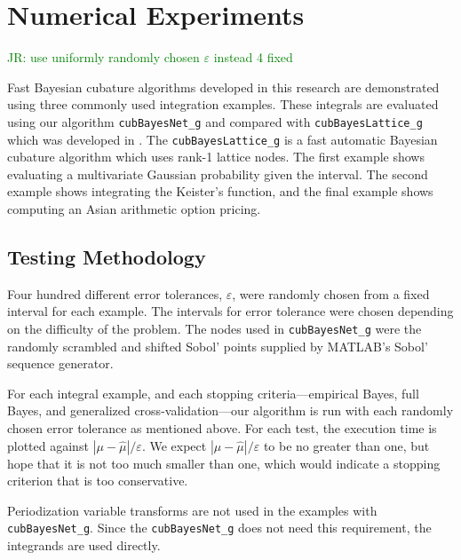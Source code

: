 \documentclass{svjour3}                     %
\newcommand{\hmu}{\widehat{\mu}}
\newcommand{\code}[1]{\texttt{#1}}
\def\abs#1{\ensuremath{\left \lvert #1 \right \rvert}}
\newcommand\secref{Section~\ref}
\newcommand{\JRNote}[1]{{\textcolor{green}{JR: #1}}}
\begin{document}
\section{Numerical Experiments}

\label{sec:NumExp}

\JRNote{use uniformly randomly chosen $\varepsilon$ instead 4 fixed}

Fast Bayesian cubature algorithms developed in this research are demonstrated using three commonly used integration examples.
These integrals are evaluated using our algorithm \code{cubBayesNet\_g} and compared with \code{cubBayesLattice\_g} which was developed in \cite{JagHic19a}. The \code{cubBayesLattice\_g} is a fast automatic Bayesian cubature algorithm which uses rank-1 lattice nodes. The first example shows evaluating a multivariate Gaussian probability given the interval. The second example shows integrating the Keister's function, and the final example shows computing an Asian arithmetic option pricing.  


\subsection{Testing Methodology}
\label{sec:numerical_experiments_cubBayesLattice}

Four hundred different error tolerances, $\varepsilon$, were randomly chosen from a fixed interval  for each example. 
The intervals for error tolerance were chosen depending on the difficulty of the problem.
The nodes used in \code{cubBayesNet\_g} were the randomly scrambled and shifted Sobol' points supplied by MATLAB's Sobol' sequence generator. 

For each integral example, and each stopping criteria---empirical Bayes, full Bayes, and generalized cross-validation---our algorithm is run with each randomly chosen error tolerance as mentioned above.  For each test, the execution time is plotted against $\abs{\mu - \hmu}/\varepsilon$.  We expect $\abs{\mu - \hmu}/\varepsilon$ to be no greater than one, but hope that it is not too much smaller than one, which would indicate a stopping criterion that is too conservative.


Periodization variable transforms are not used in the examples with \\ \allowbreak \code{cubBayesNet\_g}. Since the \allowbreak \code{cubBayesNet\_g} does not need this requirement, the integrands are used directly.
\end{document}
